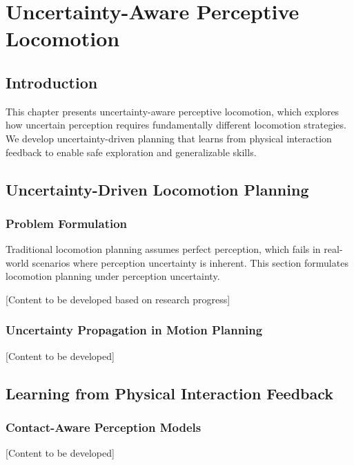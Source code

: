 \chapter{Uncertainty-Aware Perceptive Locomotion} \label{chapter:perceptive_locomotion}

\section{Introduction}

This chapter presents uncertainty-aware perceptive locomotion, which explores how uncertain perception requires fundamentally different locomotion strategies. We develop uncertainty-driven planning that learns from physical interaction feedback to enable safe exploration and generalizable skills.

\section{Uncertainty-Driven Locomotion Planning}

\subsection{Problem Formulation}

Traditional locomotion planning assumes perfect perception, which fails in real-world scenarios where perception uncertainty is inherent. This section formulates locomotion planning under perception uncertainty.

[Content to be developed based on research progress]

\subsection{Uncertainty Propagation in Motion Planning}

[Content to be developed]

\section{Learning from Physical Interaction Feedback}

\subsection{Contact-Aware Perception Models}

[Content to be developed]

